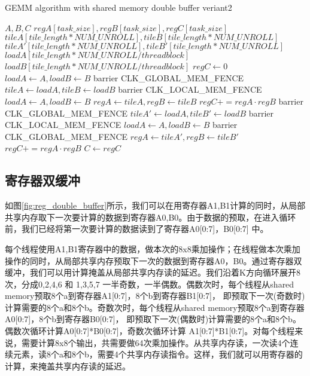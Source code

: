 \begin{algorithm}[htbp]
	\small
	\caption{GEMM algorithm with shared memory double buffer veriant2}\label{alg:gemm_sharedmem_v2}
	\begin{algorithmic}[1]
		\State $A, B, C$
		\State $regA[task\_size],regB[task\_size],regC[task\_size]$
		\State $tileA[tile\_length*NUM\_UNROLL],tileB[tile\_length*NUM\_UNROLL]$
		\State $tileA'[tile\_length*NUM\_UNROLL],tileB'[tile\_length*NUM\_UNROLL]$
		\State $loadA[tile\_length*NUM\_UNROLL/threadblock]$
		\State $loadB[tile\_length*NUM\_UNROLL/threadblock]$
		\State $regC \gets 0$
		\State $loadA \gets A, loadB \gets B $
		\State barrier CLK\_GLOBAL\_MEM\_FENCE
		\State $tileA \gets loadA, tileB \gets loadB$
		\State barrier CLK\_LOCAL\_MEM\_FENCE
		\State $loadA \gets A, loadB \gets B $
		\State $regA \gets tileA, regB \gets tileB$
		\State $regC += regA \cdot regB$
		\EndFor
		\Else
		\State barrier CLK\_GLOBAL\_MEM\_FENCE  
		\State $tileA' \gets loadA, tileB' \gets loadB$
		\State barrier CLK\_LOCAL\_MEM\_FENCE
		\State $loadA \gets A, loadB \gets B $
		\State barrier CLK\_GLOBAL\_MEM\_FENCE
		\State $regA \gets tileA', regB \gets tileB'$
		\State $regC += regA \cdot regB$
		\EndFor
		\EndIf
		\EndFor\label{gemmendfor}
		\State $C \gets regC$
	\end{algorithmic}
\end{algorithm}

\subsection{寄存器双缓冲}
如图\ref{fig:reg_double_buffer}所示，我们可以在用寄存器A1,B1计算的同时，从局部共享内存取下一次要计算的数据到寄存器A0,B0。由于数据的预取，在进入循环前，我们已经将第一次要计算的数据读到了寄存器A0[0:7]，B0[0:7] 中。

每个线程使用A1,B1寄存器中的数据，做本次的8x8乘加操作；在线程做本次乘加操作的同时，从局部共享内存预取下一次的数据到寄存器A0，B0。通过寄存器双缓冲，我们可以用计算掩盖从局部共享内存读的延迟。我们沿着K方向循环展开8次，分成0,2,4,6 和 1,3,5,7 一半奇数，一半偶数。偶数次时，每个线程从shared memory预取8个a到寄存器A1[0:7]，8个b到寄存器B1[0:7]， 即预取下一次(奇数时)计算需要的8个a和8个b。奇数次时，每个线程从shared memory预取8个a到寄存器A0[0:7]，8个b到寄存器B0[0:7]， 即预取下一次(偶数时)计算需要的8个a和8个b。偶数次循环计算A0[0:7]*B0[0:7]，奇数次循环计算 A1[0:7]*B1[0:7]。对每个线程来说，需要计算8x8个输出，共需要做64次乘加操作。从共享内存读，一次读4个连续元素，读8个a和8个b，需要4个共享内存读指令。这样，我们就可以用寄存器的计算，来掩盖共享内存读的延迟。

